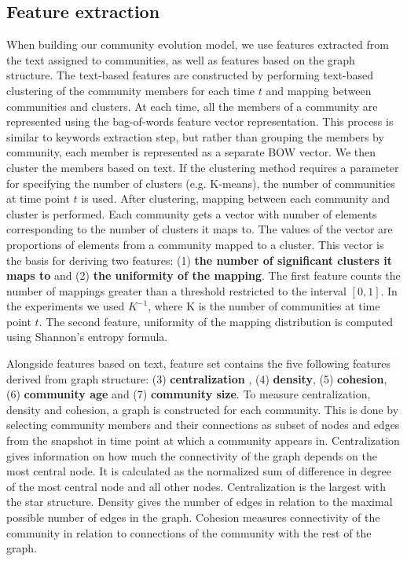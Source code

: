 \documentclass{article} %
\begin{document}
\subsection{Feature extraction}
When building our community evolution model, we use features extracted from the text assigned to communities, as well as features based on  the graph structure. The text-based features are constructed by performing text-based clustering of the community members for each time $t$ and mapping between communities and clusters. At each time,  all the members of a  community are represented using the bag-of-words feature vector representation. This process is similar to keywords extraction step, but rather than grouping the members by community, each member is represented as a separate BOW vector.  We then cluster the members based on text. If the clustering method requires a parameter for specifying the number of clusters (e.g. K-means), the number of communities at time point $t$ is used. After clustering, mapping between each community and cluster is performed. Each community gets a vector with number of elements corresponding to the number of clusters it maps to. The values of the vector are proportions of elements from a community mapped to a cluster. This vector is the basis for deriving two features: (1) {\bf the number of significant clusters it maps to} and (2) { \bf the uniformity of the mapping}. The first feature counts the number of mappings greater than a threshold restricted to the interval $[0, 1]$. In the experiments we used $K^{-1}$, where K is  the number of communities at time point $t$. The second feature, uniformity of the mapping distribution is computed using Shannon's entropy formula.

Alongside features based on text, feature set contains the five following features derived from graph structure: (3) {\bf centralization} \cite{freeman1978}, (4) {\bf density}\cite{wasserman1994}, (5) {\bf cohesion}, (6) {\bf community age} and (7) {\bf community size}. To measure centralization, density and cohesion, a graph is constructed for each community. This is done by selecting community members and their connections as subset of nodes and edges from the snapshot in time point at which a community appears in. Centralization gives information on how much the connectivity of the graph depends on the most central node. It is calculated as the normalized  sum of difference in degree of the most central node and all other nodes. Centralization is the largest with the star structure. Density gives the number of edges in relation to the maximal possible number of edges in the graph. Cohesion measures connectivity of the community in relation to connections of the community with the rest of the graph.
\end{document}
